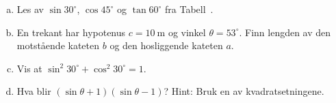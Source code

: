 %
\begin{enumerate}[a)]
    \item Les av $\sin 30^\circ$, $\cos 45^\circ$ og $\tan 60^\circ$ fra Tabell~.
    \item En trekant har hypotenus $c = \SI{10}{\metre}$ og vinkel $\theta = 53^\circ$. Finn lengden av den motstående kateten $b$ og den hosliggende kateten $a$.
    \item Vis at $\sin^2 30^\circ + \cos^2 30^\circ = 1$.
    \item Hva blir $(\sin\theta+1)(\sin\theta-1)$? Hint: Bruk en av kvadratsetningene.
\end{enumerate}
